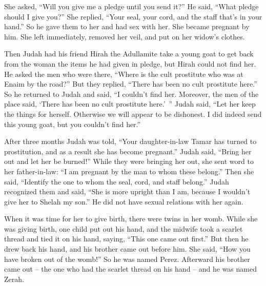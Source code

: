 {She asked,
“Will you
give
me a pledge
until
you send it?”
He said,
“What
pledge
should I give
you?” She replied,
“Your seal,
your cord,
and the staff
that’s
in your hand.”
So he gave
them to
her and had sex
with her. She became pregnant by him.
She left
immediately,
removed
her veil,
and put on
her widow’s
clothes.
\par }{\PP {}Then
Judah
had his friend
Hirah
the Adullamite
take
a young
goat
to get back from the woman
the items he had given in pledge,
but Hirah
could not
find her.
He asked
the men
who were there, “Where
is the cult prostitute
who
was at Enaim
by
the road?” But they replied,
“There has been
no
cult prostitute
here.”
So he returned
to
Judah
and said,
“I couldn’t
find
her. Moreover,
the men
of the place
said,
‘There has been no
cult prostitute
here.’ ”
Judah
said,
“Let her keep
the things for herself. Otherwise
we will appear to be
dishonest.
I did indeed
send
this
young goat,
but you
couldn’t
find her.”
\par }{\PP {}After
three
months
Judah
was told, “Your daughter-in-law
Tamar
has turned to prostitution,
and as a result she has become pregnant.”
Judah
said,
“Bring her out
and let her be burned!”
While
they were bringing her out,
she
sent
word
to
her father-in-law: “I am
pregnant
by the man
to whom
these
belong.” Then she said,
“Identify
the one to whom
the seal,
cord,
and staff
belong.”
Judah
recognized
them and said,
“She is more
upright than
I am,
because
I wouldn’t
give
her to Shelah
my son.”
He did not
have sexual relations
with her again.
\par }{\PP {}When
it was time
for her to give birth,
there
were twins
in her womb.
While
she was giving birth,
one child put
out his hand,
and the midwife
took
a scarlet
thread and tied
it on
his hand,
saying,
“This
one came out
first.”
But then he drew back
his hand,
and his brother
came out
before him. She said,
“How
you have broken out
of the womb!” So
he was named
Perez.
Afterward
his brother
came out
– the one who had
the scarlet
thread on
his hand
– and he was named
Zerah.

}
